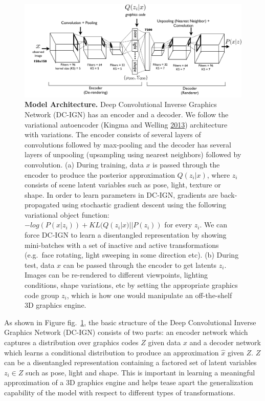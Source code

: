 \documentclass[12pt,twoside]{mitthesis}
\begin{document}
\begin{figure}[htbp]
\centering
\includegraphics{figures/overview.pdf}
\caption{\label{fig:overview}\textbf{Model Architecture.} Deep
Convolutional Inverse Graphics Network (DC-IGN) has an encoder and a
decoder. We follow the variational autoencoder (Kingma and Welling
\protect\hyperlink{ref-kingma2013auto}{2013}) architecture with
variations. The encoder consists of several layers of convolutions
followed by max-pooling and the decoder has several layers of unpooling
(upsampling using nearest neighbors) followed by convolution. (a) During
training, data $x$ is passed through the encoder to produce the
posterior approximation $Q(z_i|x)$, where $z_i$ consists of scene
latent variables such as pose, light, texture or shape. In order to
learn parameters in DC-IGN, gradients are back-propagated using
stochastic gradient descent using the following variational object
function: $-log(P(x|z_i)) + KL(Q(z_i|x)||P(z_i))$ for every $z_i$.
We can force DC-IGN to learn a disentangled representation by showing
mini-batches with a set of inactive and active transformations
(e.g.~face rotating, light sweeping in some direction etc). (b) During
test, data $x$ can be passed through the encoder to get latents
$z_i$. Images can be re-rendered to different viewpoints, lighting
conditions, shape variations, etc by setting the appropriate graphics
code group $z_i$, which is how one would manipulate an off-the-shelf
3D graphics engine.}
\end{figure}

As shown in Figure fig.~\ref{fig:overview}, the basic structure of the
Deep Convolutional Inverse Graphics Network (DC-IGN) consists of two
parts: an encoder network which captures a distribution over graphics
codes $Z$ given data $x$ and a decoder network which learns a
conditional distribution to produce an approximation $\hat{x}$ given
$Z$. $Z$ can be a disentangled representation containing a factored
set of latent variables $z_i \in Z$ such as pose, light and shape.
This is important in learning a meaningful approximation of a 3D
graphics engine and helps tease apart the generalization capability of
the model with respect to different types of transformations.
\end{document}
